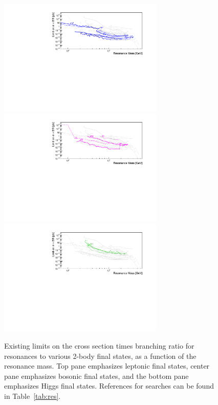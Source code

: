 \begin{figure}
\includegraphics[width=0.7\textwidth]{figures/chapter_topo/all_4.pdf}
\includegraphics[width=0.7\textwidth]{figures/chapter_topo/all_6.pdf}
\includegraphics[width=0.7\textwidth]{figures/chapter_topo/all_8.pdf}
\caption{ Existing limits on the cross section times branching ratio for resonances to various 2-body final states, as a function of the resonance mass. Top pane emphasizes leptonic final states, center pane emphasizes bosonic final states, and the bottom pane emphasizes Higgs final states. References for searches can be found in Table~\ref{tab:res}.}
\label{fig:lwh}
\end{figure}




